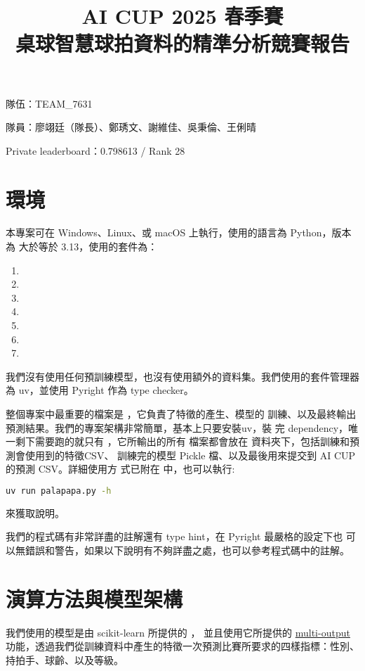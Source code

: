 \documentclass[12pt, a4paper]{article}
\title{\fontsize{20}{24}\selectfont AI CUP 2025 春季賽\\桌球智慧球拍資料的精準分析競賽報告\vspace{-3cm}}
\author{}
\date{}
\begin{document}
    \maketitle
    \noindent 隊伍：TEAM\_7631

    \noindent 隊員：廖翊廷（隊長）、鄭琇文、謝維佳、吳秉倫、王俐晴

    \noindent Private leaderboard：0.798613 / Rank 28
    \section{環境}
        本專案可在 Windows、Linux、或 macOS 上執行，使用的語言為 Python，版本為
        大於等於 3.13，使用的套件為：
        \begin{enumerate}
            \item {}
            \item {}
            \item {}
            \item {}
            \item {}
            \item {}
            \item {}
        \end{enumerate}
        我們沒有使用任何預訓練模型，也沒有使用額外的資料集。我們使用的套件管理器
        為 uv，並使用 Pyright 作為 type checker。

        整個專案中最重要的檔案是 ，它負責了特徵的產生、模型的
        訓練、以及最終輸出預測結果。我們的專案架構非常簡單，基本上只要安裝uv，裝
        完 dependency，唯一剩下需要跑的就只有 ，它所輸出的所有
        檔案都會放在  資料夾下，包括訓練和預測會使用到的特徵CSV、
        訓練完的模型 Pickle 檔、以及最後用來提交到 AI CUP 的預測 CSV。詳細使用方
        式已附在  中，也可以執行:
        \begin{lstlisting}[language = Bash]
            uv run palapapa.py -h
        \end{lstlisting}
        來獲取說明。

        我們的程式碼有非常詳盡的註解還有 type hint，在 Pyright 最嚴格的設定下也
        可以無錯誤和警告，如果以下說明有不夠詳盡之處，也可以參考程式碼中的註解。
    \section{演算方法與模型架構}
        我們使用的模型是由 scikit-learn 所提供的 ，
        並且使用它所提供的
        \href{https://scikit-learn.org/stable/modules/tree.html#multi-output-problems}{multi-output}
        功能，透過我們從訓練資料中產生的特徵一次預測比賽所要求的四樣指標：性別、
        持拍手、球齡、以及等級。
\end{document}
